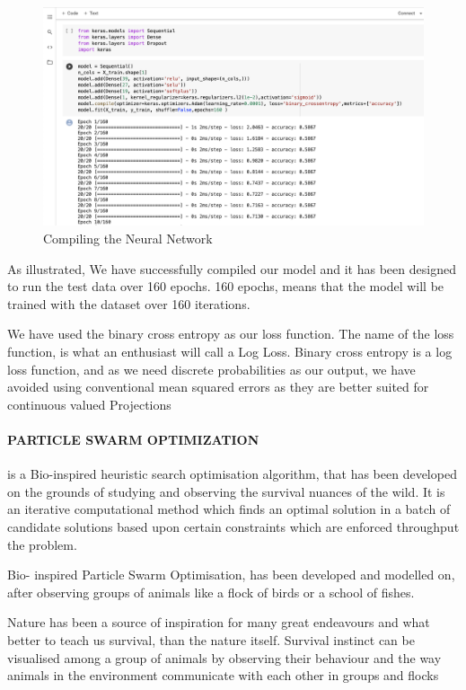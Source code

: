 \documentclass[12pt]{article}
\newcommand{\nd}{\noindent}
\begin{document}
\begin{center}
\begin{figure}[h]
\centerline{\includegraphics[scale=.4]{nn.png}}
\caption{Compiling the Neural Network}
\end{figure}
\end{center}

\nd As illustrated, We have successfully compiled our model and it has been designed to run the test data over 160 epochs. 160 epochs, means that the model will be trained with the dataset over 160 iterations. 

\nd We have used the binary cross entropy as our loss function. The name of the loss function, is what an enthusiast will call a Log Loss. Binary cross entropy is a log loss function, and as we need discrete probabilities as our output, we have avoided using conventional mean squared errors as they are better suited for continuous valued Projections 
\newpage 
\paragraph{PARTICLE SWARM OPTIMIZATION}
is a Bio-inspired heuristic search optimisation algorithm, that has been developed on the grounds of studying and observing the survival nuances of the wild. It is an iterative computational method which finds an optimal solution in a batch of candidate solutions based upon certain constraints which are enforced throughput the problem. 

\nd Bio- inspired Particle Swarm Optimisation, has been developed and modelled on, after observing groups of animals like a flock of birds or a school of fishes. 

\nd Nature has been a source of inspiration for many great endeavours and what better to teach us survival, than the nature itself. Survival instinct can be visualised among a group of animals by observing their behaviour and the way animals in the environment communicate with each other in groups and flocks
\end{document}

